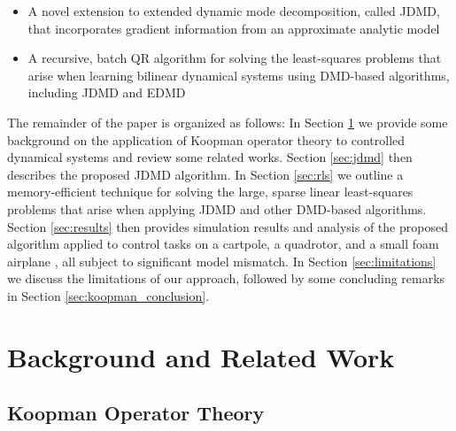 \documentclass[../root.tex]{subfiles}
\begin{document}
\begin{itemize}
  \item A novel extension to extended dynamic mode decomposition, called JDMD, that
  incorporates gradient information from an approximate analytic model
  
  \item A recursive, batch QR algorithm for solving the least-squares problems that arise 
  when learning bilinear dynamical systems using DMD-based algorithms, including JDMD and EDMD
  
\end{itemize}

The remainder of the paper is organized as follows: In Section
\ref{sec:Preliminaries/Background} we provide some background on the application
of Koopman operator theory to controlled dynamical systems and review some
related works.  Section \ref{sec:jdmd} then describes the proposed JDMD
algorithm.  In Section \ref{sec:rls} we outline a memory-efficient technique for
solving the large, sparse linear least-squares problems that arise when applying
JDMD and other DMD-based algorithms.  
Section \ref{sec:results} then provides simulation results and analysis of the
proposed algorithm applied to control tasks on a cartpole, a quadrotor, and a
small foam airplane , all subject to significant model mismatch.   In Section
\ref{sec:limitations} we discuss the limitations of our approach, followed by
some concluding remarks in Section \ref{sec:koopman_conclusion}.

\section{Background and Related Work} \label{sec:Preliminaries/Background}

\subsection{Koopman Operator Theory}
\end{document}
